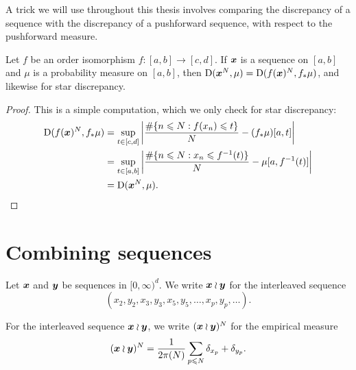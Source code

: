 A trick we will use throughout this thesis involves comparing the discrepancy 
of a sequence with the discrepancy of a pushforward sequence, with respect to 
the pushforward measure. 

\begin{lemma}\label{lem:push-discrepancy}
Let $f$ be an order isomorphism $f\colon [a,b] \to [c,d]$. If 
${\boldsymbol x}$ is a sequence on $[a,b]$ and $\mu$ is a probability measure on 
$[a,b]$, then 
$\operatorname{D}({\boldsymbol x}^N, \mu) = \operatorname{D}(f({\boldsymbol x})^N, f_\ast \mu)$, 
and likewise for star discrepancy. 
\end{lemma}
\begin{proof}
This is a simple computation, which we only check for star discrepancy: 
\begin{align*}
	\operatorname{D}(f({\boldsymbol x})^N, f_\ast \mu)
		&= \sup_{t\in [c,d]} \left| \frac{\#\{n\leqslant N : f(x_n) \leqslant t\}}{N} - (f_\ast \mu)[a,t]\right| \\
		&= \sup_{t\in [a,b]} \left| \frac{\#\{n\leqslant N : x_n \leqslant f^{-1}(t)\}}{N} - \mu[a,f^{-1}(t)]\right| \\
		&= \operatorname{D}({\boldsymbol x}^N, \mu) .
\end{align*}
\end{proof}





\section{Combining sequences}

\begin{definition}
Let ${\boldsymbol x}$ and ${\boldsymbol y}$ be sequences in $[0,\infty)^d$. We write ${\boldsymbol x}\wr{\boldsymbol y}$ for 
the interleaved sequence 
\[
	(x_2,y_2,x_3,y_3,x_5,y_5,\dots,x_p,y_p,\dots) .
\]
\end{definition}

For the interleaved sequence ${\boldsymbol x}\wr{\boldsymbol y}$, we write $({\boldsymbol x}\wr{\boldsymbol y})^N$ for the 
empirical measure 
\[
	({\boldsymbol x}\wr{\boldsymbol y})^N = \frac{1}{2\pi(N)} \sum_{p\leqslant N} \delta_{x_p} + \delta_{y_p} .
\]

